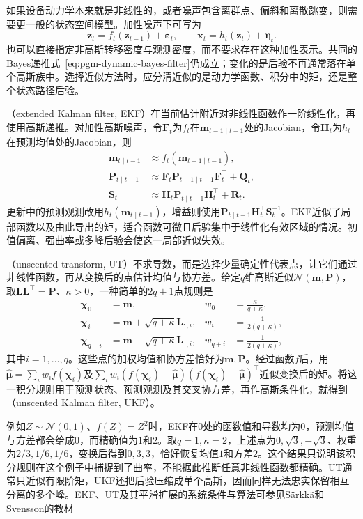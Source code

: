 如果设备动力学本来就是非线性的，或者噪声包含离群点、偏斜和离散跳变，则需要更一般的状态空间模型。加性噪声下可写为
\begin{equation}
  \bm z_t=f_t(\bm z_{t-1})+\bm\varepsilon_t,\qquad
  \bm x_t=h_t(\bm z_t)+\bm\eta_t.
  \label{eq:pgm-dynamic-nonlinear}
\end{equation}
也可以直接指定非高斯转移密度与观测密度，而不要求存在这种加性表示。共同的Bayes递推式~\eqref{eq:pgm-dynamic-bayes-filter}仍成立；变化的是后验不再通常落在单个高斯族中。选择近似方法时，应分清近似的是动力学函数、积分中的矩，还是整个状态路径后验。

（extended Kalman filter, EKF）在当前估计附近对非线性函数作一阶线性化，再使用高斯递推。对加性高斯噪声，令$\bm F_t$为$f_t$在$\bm m_{t-1\mid t-1}$处的Jacobian，令$\bm H_t$为$h_t$在预测均值处的Jacobian，则
\[
  \begin{aligned}
    \bm m_{t\mid t-1}&\approx f_t(\bm m_{t-1\mid t-1}),\\
    \bm P_{t\mid t-1}
      &\approx\bm F_t\bm P_{t-1\mid t-1}\bm F_t^\top+\bm Q_t,\\
    \bm S_t&\approx\bm H_t\bm P_{t\mid t-1}\bm H_t^\top+\bm R_t.
  \end{aligned}
\]
更新中的预测观测改用$h_t(\bm m_{t\mid t-1})$，增益则使用$\bm P_{t\mid t-1}\bm H_t^\top\bm S_t^{-1}$。EKF近似了局部函数以及由此导出的矩，适合函数可微且后验集中于线性化有效区域的情况。初值偏离、强曲率或多峰后验会使这一局部近似失效。

（unscented transform, UT）不求导数，而是选择少量确定性代表点，让它们通过非线性函数，再从变换后的点估计均值与协方差。给定$q$维高斯近似$\mathcal N(\bm m,\bm P)$，取$\bm L\bm L^\top=\bm P$、$\kappa>0$，一种简单的$2q+1$点规则是
\[
  \begin{aligned}
    \bm\chi_0&=\bm m,&w_0&=\frac{\kappa}{q+\kappa},\\
    \bm\chi_i&=\bm m+\sqrt{q+\kappa}\bm L_{:,i},
      &w_i&=\frac{1}{2(q+\kappa)},\\
    \bm\chi_{q+i}&=\bm m-\sqrt{q+\kappa}\bm L_{:,i},
      &w_{q+i}&=\frac{1}{2(q+\kappa)},
  \end{aligned}
\]
其中$i=1,\ldots,q$。这些点的加权均值和协方差恰好为$\bm m,\bm P$。经过函数$f$后，用$\widehat{\bm\mu}=\sum_iw_i f(\bm\chi_i)$及$\sum_iw_i(f(\bm\chi_i)-\widehat{\bm\mu})(f(\bm\chi_i)-\widehat{\bm\mu})^\top$近似变换后的矩。将这一积分规则用于预测状态、预测观测及其交叉协方差，再作高斯条件化，就得到（unscented Kalman filter, UKF）。

例如$Z\sim\mathcal N(0,1)$、$f(Z)=Z^2$时，EKF在$0$处的函数值和导数均为$0$，预测均值与方差都会给成$0$，而精确值为$1$和$2$。取$q=1,\kappa=2$，上述点为$0,\sqrt3,-\sqrt3$、权重为$2/3,1/6,1/6$，变换后得到$0,3,3$，恰好恢复均值$1$和方差$2$。这个结果只说明该积分规则在这个例子中捕捉到了曲率，不能据此推断任意非线性函数都精确。UT通常只近似有限阶矩，UKF还把后验压缩成单个高斯，因而同样无法忠实保留相互分离的多个峰。EKF、UT及其平滑扩展的系统条件与算法可参见Särkkä和Svensson的教材

